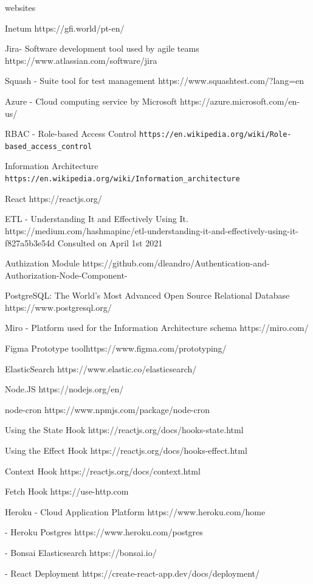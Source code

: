 \documentclass[a4paper,twoside,10pt]{report}
\begin{document}
\begin{thebibliography} {websites}

 Inetum https://gfi.world/pt-en/

 Jira- Software development tool used by agile teams
https://www.atlassian.com/software/jira

 Squash - Suite tool for test management
https://www.squashtest.com/?lang=en

 Azure - Cloud computing service by Microsoft
https://azure.microsoft.com/en-us/

 RBAC - Role-based Access Control
\texttt{https://en.wikipedia.org/wiki/Role-based\_access\_control}

 Information Architecture
\texttt{https://en.wikipedia.org/wiki/Information\_architecture}

 React https://reactjs.org/

 ETL - Understanding It and Effectively Using It.
https://medium.com/hashmapinc/etl-understanding-it-and-effectively-using-it-f827a5b3e54d
Consulted on April 1st 2021

 Authization Module
https://github.com/dleandro/Authentication-and-Authorization-Node-Component-

 PostgreSQL: The World's Most Advanced Open Source Relational Database
https://www.postgresql.org/

 Miro - Platform used for the Information Architecture schema
https://miro.com/

 Figma Prototype toolhttps://www.figma.com/prototyping/

 ElasticSearch  https://www.elastic.co/elasticsearch/

 Node.JS  https://nodejs.org/en/

 node-cron  https://www.npmjs.com/package/node-cron

 Using the State Hook
https://reactjs.org/docs/hooks-state.html

 Using the Effect Hook
https://reactjs.org/docs/hooks-effect.html

 Context Hook
https://reactjs.org/docs/context.html

 Fetch Hook
https://use-http.com

 Heroku - Cloud Application Platform
https://www.heroku.com/home

 - Heroku Postgres
https://www.heroku.com/postgres

 - Bonsai Elasticsearch
https://bonsai.io/

 - React Deployment
https://create-react-app.dev/docs/deployment/
\end{thebibliography}
\end{document}

